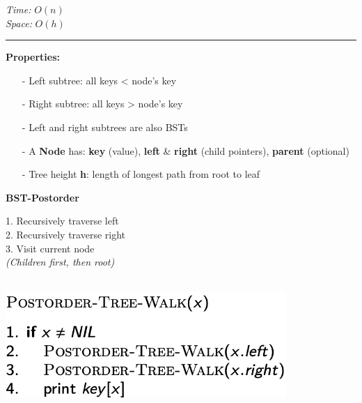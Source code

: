 {\begin{minipage}[t]{1\textwidth}
\begin{minipage}[t]{0.19\textwidth}
        \textit{Time:} \(O(n)\)\\
        \textit{Space:} \(O(h)\)\\[2pt]
        \begin{minipage}[t]{1.6\textwidth}
        \hrule
        \end{minipage}
        \vspace{2pt}
        \textbf{Properties:}\\
        \begin{minipage}[t]{1.6\textwidth}
            \begin{itemize}
            \item[-] Left subtree: all keys < node's key
            \item[-] Right subtree: all keys > node's key
            \item[-] Left and right subtrees are also BSTs
            \item[-] A \textbf{Node} has: \textbf{key} (value), \textbf{left} \& \textbf{right} (child pointers), \textbf{parent} (optional)
            \item[-] Tree height \textbf{h}: length of longest path from root to leaf
            \end{itemize}
        \end{minipage}
    \end{minipage}
    \hfill
    \begin{minipage}[t]{0.19\textwidth}
        \centering
        \textbf{\scriptsize BST-Postorder}\\[2pt]
        \scriptsize
        \begin{minipage}[t]{\textwidth}
            \scriptsize
            1. Recursively traverse left\\
            2. Recursively traverse right\\
            3. Visit current node\\
            \textit{(Children first, then root)}
        \end{minipage}\\[4pt]
        \includegraphics[width=0.8\textwidth]{images/bst-postorder.png}\\[2pt]

\end{minipage}
\end{minipage}}
